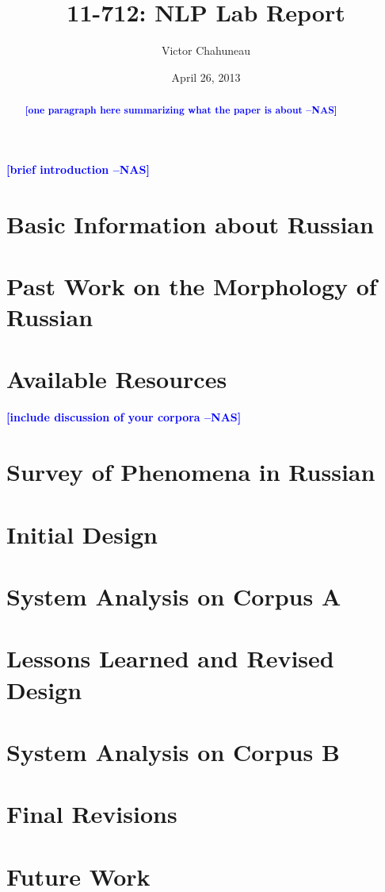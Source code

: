 \documentclass[11pt,letterpaper]{article}
\title{11-712:  NLP Lab Report}
\author{Victor Chahuneau}
\date{April 26, 2013}
\newcommand{\nascomment}[1]{\textcolor{blue}{\textbf{[#1 --NAS]}}}
\begin{document}
\maketitle
\begin{abstract}
\nascomment{one paragraph here summarizing what the paper is about}
\end{abstract}

\nascomment{brief introduction}

\section{Basic Information about Russian}

\section{Past Work on the Morphology of Russian}

\section{Available Resources}

\nascomment{include discussion of your corpora}

\section{Survey of Phenomena in Russian}

\section{Initial Design}

\section{System Analysis on Corpus A}

\section{Lessons Learned and Revised Design}

\section{System Analysis on Corpus B}

\section{Final Revisions}

\section{Future Work}




\label{lastpage}
\end{document}
